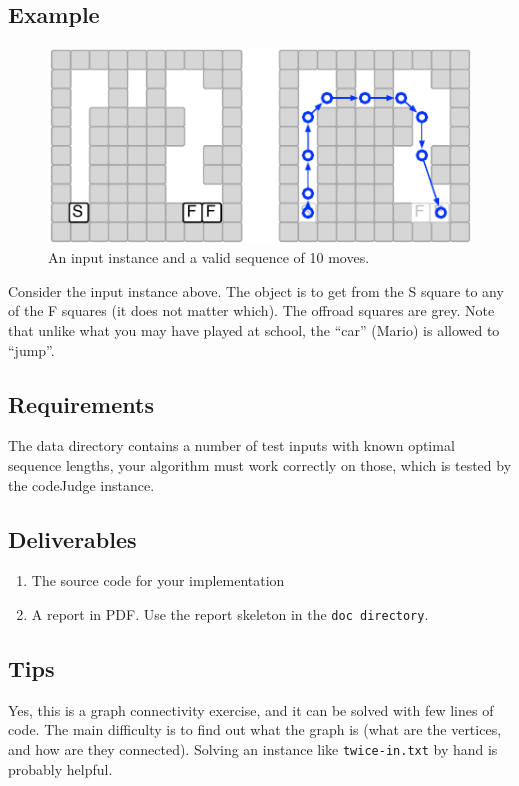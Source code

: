 \documentclass{tufte-handout}
\begin{document}
\subsection{Example}

\begin{figure}
  \includegraphics{racetrack.pdf}
  \caption{An input instance and a valid sequence of 10 moves.}
\end{figure}

Consider the input instance above.
The object is to get from the S square to any of the F squares (it does not matter which).
The offroad squares are grey.
Note that unlike what you may have played at school, the ``car'' (Mario) is allowed to ``jump''.

\subsection{Requirements}

The data directory contains a number of test inputs with known optimal sequence lengths, your algorithm must work correctly on those, 
which is tested by the codeJudge instance.

\subsection{Deliverables}

\begin{enumerate}
  \item The source code for your implementation
  \item A report in PDF.
  Use the report skeleton in the {\tt doc directory}.
  \end{enumerate}

\subsection{Tips}

Yes, this is a graph connectivity exercise, and it can be solved with few lines of code.
The main difficulty is to find out what the graph is (what are the vertices, and how are they connected).
Solving an instance like {\tt twice-in.txt} by hand is probably helpful.
\end{document}
